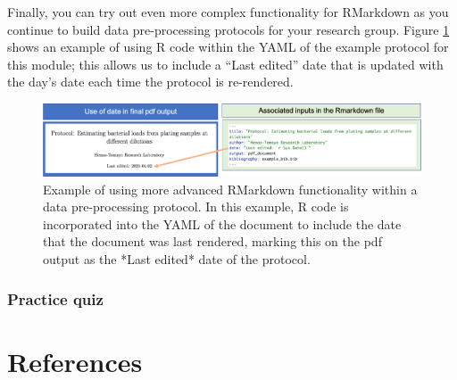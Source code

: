 \documentclass[]{tufte-book}
\begin{document}
Finally, you can try out even more complex functionality for RMarkdown as you
continue to build data pre-processing protocols for your research group. Figure
\ref{fig:protocolyaml} shows an example of using R code within the YAML of the
example protocol for this module; this allows us to include a ``Last edited'' date
that is updated with the day's date each time the protocol is re-rendered.

\begin{figure}
\includegraphics[width=\textwidth]{figures/protocol_yaml_date} \caption[Example of using more advanced RMarkdown functionality within a data pre-processing protocol]{Example of using more advanced RMarkdown functionality within a data pre-processing protocol. In this example, R code is incorporated into the YAML of the document to include the date that the document was last rendered, marking this on the pdf output as the *Last edited* date of the protocol.}\label{fig:protocolyaml}
\end{figure}

\hypertarget{practice-quiz-4}{%
\subsection{Practice quiz}\label{practice-quiz-4}}

\hypertarget{references}{%
\chapter{References}\label{references}}


\end{document}
